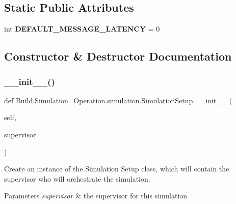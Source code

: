 \subsection*{Static Public Attributes}
\begin{DoxyCompactItemize}
\item 
\mbox{\label{class_build_1_1_simulation___operation_1_1simulation_1_1_simulation_setup_a0224fb07b15747a6fd9375480d47a964}} 
int {\bfseries D\+E\+F\+A\+U\+L\+T\+\_\+\+M\+E\+S\+S\+A\+G\+E\+\_\+\+L\+A\+T\+E\+N\+CY} = 0
\end{DoxyCompactItemize}


\subsection{Constructor \& Destructor Documentation}
\mbox{\label{class_build_1_1_simulation___operation_1_1simulation_1_1_simulation_setup_a28c30509115384851598b77663c44d1f}} 
\subsubsection{\texorpdfstring{\+\_\+\+\_\+init\+\_\+\+\_\+()}{\_\_init\_\_()}}
{\footnotesize\ttfamily def Build.\+Simulation\+\_\+\+Operation.\+simulation.\+Simulation\+Setup.\+\_\+\+\_\+init\+\_\+\+\_\+ (\begin{DoxyParamCaption}\item[{}]{self,  }\item[{}]{supervisor }\end{DoxyParamCaption})}



Create an instance of the Simulation Setup class, which will contain the supervisor who will orchestrate the simulation. 


\begin{DoxyParams}{Parameters}
{\em supervisor} & the supervisor for this simulation \\
\hline
\end{DoxyParams}



